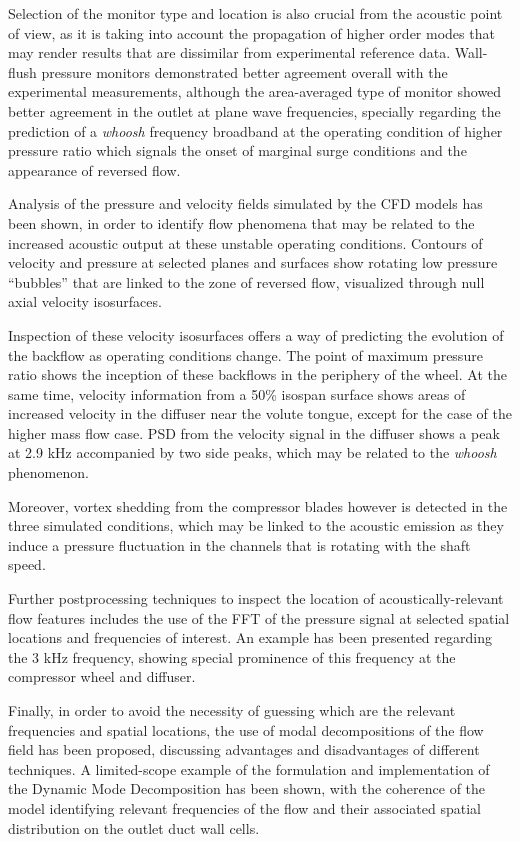 Selection of the monitor type and location is also crucial from the acoustic point of view, as it is taking into account the propagation of higher order modes that may render results that are dissimilar from experimental reference data. Wall-flush pressure monitors demonstrated better agreement overall with the experimental measurements, although the area-averaged type of monitor showed better agreement in the outlet at plane wave frequencies, specially regarding the prediction of a \emph{whoosh} frequency broadband at the operating condition of higher pressure ratio which signals the onset of marginal surge conditions and the appearance of reversed flow.

Analysis of the pressure and velocity fields simulated by the CFD models has been shown, in order to identify flow phenomena that may be related to the increased acoustic output at these unstable operating conditions. Contours of velocity and pressure at selected planes and surfaces show rotating low pressure ``bubbles'' that are linked to the zone of reversed flow, visualized through null axial velocity isosurfaces.

Inspection of these velocity isosurfaces offers a way of predicting the evolution of the backflow as operating conditions change. The point of maximum pressure ratio shows the inception of these backflows in the periphery of the wheel. At the same time, velocity information from a 50\% isospan surface shows areas of increased velocity in the diffuser near the volute tongue, except for the case of the higher mass flow case. PSD from the velocity signal in the diffuser shows a peak at 2.9 kHz accompanied by two side peaks, which may be related to the \emph{whoosh} phenomenon.

Moreover, vortex shedding from the compressor blades however is detected in the three simulated conditions, which may be linked to the acoustic emission as they induce a pressure fluctuation in the channels that is rotating with the shaft speed.

Further postprocessing techniques to inspect the location of acoustically-relevant flow features includes the use of the FFT of the pressure signal at selected spatial locations and frequencies of interest. An example has been presented regarding the 3 kHz frequency, showing special prominence of this frequency at the compressor wheel and diffuser.

Finally, in order to avoid the necessity of guessing which are the relevant frequencies and spatial locations, the use of modal decompositions of the flow field has been proposed, discussing advantages and disadvantages of different techniques. A limited-scope example of the formulation and implementation of the Dynamic Mode Decomposition has been shown, with the coherence of the model identifying relevant frequencies of the flow and their associated spatial distribution on the outlet duct wall cells.

